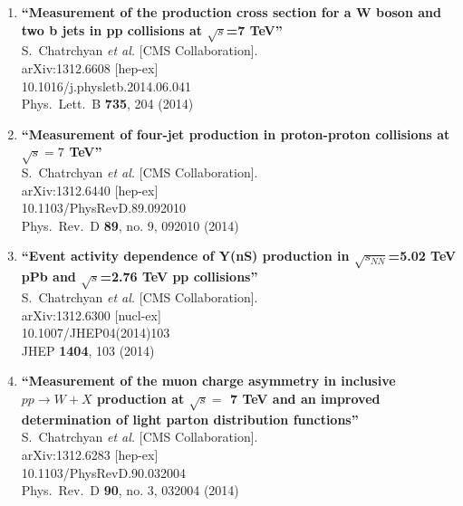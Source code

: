 \documentclass{article}
\begin{document}
\begin{enumerate}
\item%
{\bf ``Measurement of the production cross section for a W boson and two b jets in pp collisions at $\sqrt{s}$=7 TeV''}
  \\{}S.~Chatrchyan {\it et al.}  [CMS Collaboration].
  \\{}arXiv:1312.6608 [hep-ex]
    \\{}10.1016/j.physletb.2014.06.041
\\{}Phys.\ Lett.\ B {\bf 735}, 204 (2014) %


\item%
{\bf ``Measurement of four-jet production in proton-proton collisions at $\sqrt{s}=7$  TeV''}
  \\{}S.~Chatrchyan {\it et al.}  [CMS Collaboration].
  \\{}arXiv:1312.6440 [hep-ex]
    \\{}10.1103/PhysRevD.89.092010
\\{}Phys.\ Rev.\ D {\bf 89}, no. 9, 092010 (2014) %


\item%
{\bf ``Event activity dependence of Y(nS) production in $\sqrt{s_{NN}}$=5.02 TeV pPb and $\sqrt{s}$=2.76 TeV pp collisions''}
  \\{}S.~Chatrchyan {\it et al.}  [CMS Collaboration].
  \\{}arXiv:1312.6300 [nucl-ex]
    \\{}10.1007/JHEP04(2014)103
\\{}JHEP {\bf 1404}, 103 (2014) %


\item%
{\bf ``Measurement of the muon charge asymmetry in inclusive $pp \to W+X$ production at $\sqrt s =$ 7 TeV and an improved determination of light parton distribution functions''}
  \\{}S.~Chatrchyan {\it et al.}  [CMS Collaboration].
  \\{}arXiv:1312.6283 [hep-ex]
    \\{}10.1103/PhysRevD.90.032004
\\{}Phys.\ Rev.\ D {\bf 90}, no. 3, 032004 (2014) %



\end{enumerate}
\end{document}
